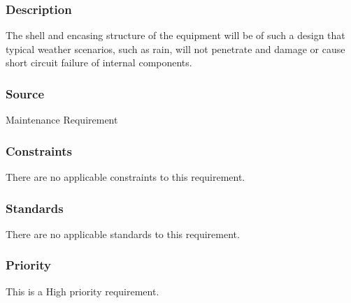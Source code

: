 \subsubsection{Description}
The shell and encasing structure of the equipment will be of such a design that typical weather scenarios, such as rain, will not penetrate and damage or cause short circuit failure of internal components.
\subsubsection{Source}
Maintenance Requirement
\subsubsection{Constraints}
There are no applicable constraints to this requirement.
\subsubsection{Standards}
There are no applicable standards to this requirement.
\subsubsection{Priority}
This is a High priority requirement.